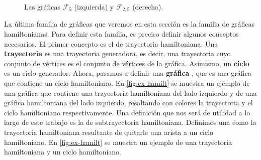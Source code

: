 \begin{figure}[ht!]
    \centering
\caption{Las gr\'aficas $\mathcal{F}_5$ (izquierda) y $\mathcal{F}_{2,5}$
(derecha).}
\label{fig:ex-abanico}
\end{figure}


La \'ultima familia de gr\'aficas que veremos en esta secci\'on es la familia de
gr\'aficas hamiltonianas. Para definir esta familia, es preciso definir algunos
conceptos necesarios. El primer concepto es el de trayectoria hamiltoniana. Una
\textbf{trayectoria}
 es una
trayectoria generadora, es decir, una trayectoria cuyo conjunto de v\'ertices es
el conjunto de v\'ertices de la gr\'afica. Asimismo, un \textbf{ciclo}
 es un ciclo generador.
Ahora, pasamos a definir una \textbf{gr\'afica}
, que es una
gr\'afica que contiene un ciclo hamiltoniano. En \cref{fig:ex-hamilt} se muestra
un ejemplo de una gr\'afica que contiene una trayectoria hamiltoniana del lado
izquierdo y de una gr\'afica hamiltoniana del lado izquierdo, resaltando con
colores la trayectoria y el ciclo hamiltoniano respectivamente. Una definici\'on
que nos ser\'a de utilidad a lo largo de este trabajo es la de subtrayectoria
hamiltoniana. Definimos una  como la trayectoria
hamiltoniana resultante de quitarle una arista a un ciclo hamiltoniano. En
\cref{fig:ex-hamilt} se muestra un ejemplo de una trayectoria hamiltoniana y un
ciclo hamiltoniano.

